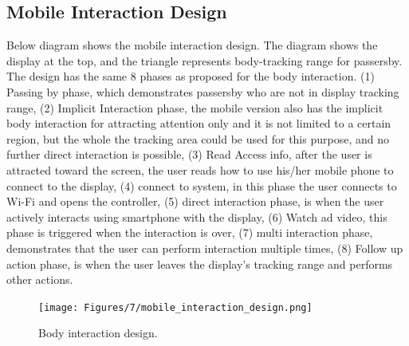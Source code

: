 \subsection{Mobile Interaction Design}
Below diagram shows the mobile interaction design. The diagram shows the display at the top, and the triangle represents body-tracking range for passersby. The design has the same 8 phases as proposed for the body interaction. (1) Passing by phase, which demonstrates passersby who are not in display tracking range, (2) Implicit Interaction phase, the mobile version also has the implicit body interaction for attracting attention only and it is not limited to a certain region, but the whole the tracking area could be used for this purpose, and no further direct interaction is possible, (3) Read Access info, after the user is attracted toward the screen, the user reads how to use his/her mobile phone to connect to the display, (4) connect to system, in this phase the user connects to Wi-Fi and opens the controller, (5) direct interaction phase, is when the user actively interacts using smartphone with the display, (6) Watch ad video, this phase is triggered when the interaction is over, (7) multi interaction phase, demonstrates that the user can perform interaction multiple times, (8) Follow up action phase, is when the user leaves the display’s tracking range and performs other actions.

\begin{figure}[H]
    \centering
    \texttt{[image: Figures/7/mobile\_interaction\_design.png]}
    \caption{Body interaction design.}%
    \label{fig:body_interaction_deisng}%
\end{figure}



